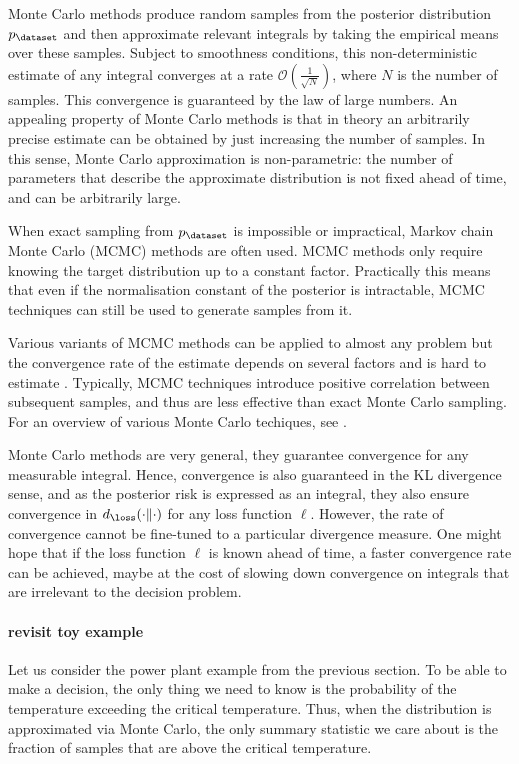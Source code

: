 Monte Carlo methods produce random samples from the posterior distribution $p_\dataset$ and then approximate relevant integrals by taking the empirical means over these samples. Subject to smoothness conditions, this non-deterministic estimate of any integral converges at a rate $\mathcal{O}(\frac{1}{\sqrt{N}})$, where $N$ is the number of samples. This convergence is guaranteed by the law of large numbers. An appealing property of Monte Carlo methods is that in theory an arbitrarily precise estimate can be obtained by just increasing the number of samples. In this sense, Monte Carlo approximation is non-parametric: the number of parameters that describe the approximate distribution is not fixed ahead of time, and can be arbitrarily large.

When exact sampling from $p_\dataset$ is impossible or impractical, Markov chain Monte Carlo (MCMC) methods are often used. MCMC methods only require knowing the target distribution up to a constant factor. Practically this means that even if the normalisation constant of the posterior is intractable, MCMC techniques can still be used to generate samples from it.

Various variants of MCMC methods can be applied to almost any problem but the convergence rate of the estimate depends on several factors and is hard to estimate \citep{CowlesCarlin96}. Typically, MCMC techniques introduce positive correlation between subsequent samples, and thus are less effective than exact Monte Carlo sampling. For an overview of various Monte Carlo techiques, see \citep{Murray2007}.

Monte Carlo methods are very general, they guarantee convergence for any measurable integral. Hence, convergence is also guaranteed in the KL divergence sense, and as the posterior risk is expressed as an integral, they also ensure convergence in $d_\loss(\cdot\|\cdot)$ for any loss function $\ell$. However, the rate of convergence cannot be fine-tuned to a particular divergence measure. One might hope that if the loss function $\ell$ is known ahead of time, a faster convergence rate can be achieved, maybe at the cost of slowing down convergence on integrals that are irrelevant to the decision problem.

\paragraph{revisit toy example} Let us consider the power plant example from the previous section. To be able to make a decision, the only thing we need to know is the probability of the temperature exceeding the critical temperature. Thus, when the distribution is approximated via Monte Carlo, the only summary statistic we care about is the fraction of samples that are above the critical temperature.

